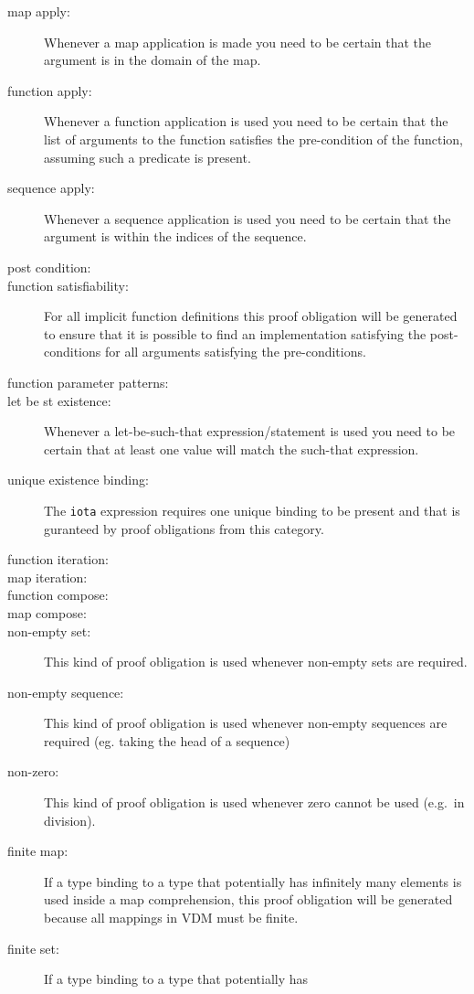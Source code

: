 \documentclass{overturerepchap}
\begin{document}
\begin{description}
\item[map apply:] Whenever a map application is made you need to be
  certain that the argument is in the domain of the map.
\item[function apply:] Whenever a function application is used you need to be
  certain that the list of arguments to the function satisfies the
  pre-condition of the function, assuming such a predicate is present.
\item[sequence apply:] Whenever a sequence application is used you need to be
  certain that the argument is within the indices of the sequence.
\item[post condition:]
\item[function satisfiability:] For all implicit function definitions
  this proof obligation will be generated to ensure that it is
  possible to find an implementation satisfying the post-conditions for all
  arguments satisfying the pre-conditions.
\item[function parameter patterns:]
\item[let be st existence:] Whenever a let-be-such-that
  expression/statement is used you need to be certain that at least one value
  will match the such-that expression.
\item[unique existence binding:] The \texttt{iota} expression
  requires one unique binding to be present and that is guranteed by
  proof obligations from this category.
\item[function iteration:] 
\item[map iteration:]
\item[function compose:]
\item[map compose:]
\item[non-empty set:] This kind of proof obligation is used whenever
  non-empty sets are required.
\item[non-empty sequence:] This kind of proof obligation is used whenever
  non-empty sequences are required (eg. taking the head of a sequence)
\item[non-zero:] This kind of proof obligation is used whenever zero
  cannot be used (e.g.\ in division).
\item[finite map:] If a type binding to a type that potentially has
  infinitely many elements is used inside a map comprehension, this
  proof obligation will be generated because all mappings in VDM must be finite.
\item[finite set:] If a type binding to a type that potentially has

\end{description}
\end{document}
